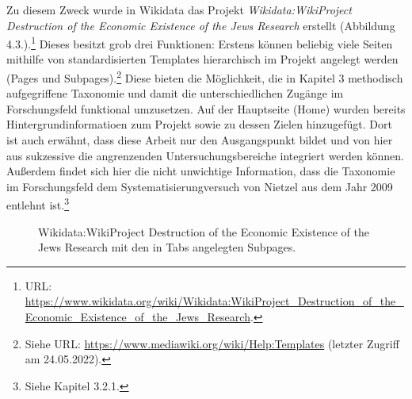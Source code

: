 Zu diesem Zweck wurde in Wikidata das Projekt \textit{Wikidata:WikiProject Destruction of the Economic Existence of the Jews Research} erstellt (Abbildung 4.3.).\footnote{URL: \url{https://www.wikidata.org/wiki/Wikidata:WikiProject_Destruction_of_the_Economic_Existence_of_the_Jews_Research}.} Dieses besitzt grob drei Funktionen: Erstens können beliebig viele Seiten mithilfe von standardisierten Templates hierarchisch im Projekt angelegt werden (Pages und Subpages).\footnote{Siehe URL: \url{https://www.mediawiki.org/wiki/Help:Templates} (letzter Zugriff am 24.05.2022).} Diese bieten die Möglichkeit, die in Kapitel 3 methodisch aufgegriffene Taxonomie und damit die unterschiedlichen Zugänge im Forschungsfeld funktional umzusetzen. Auf der Hauptseite (Home) wurden bereits Hintergrundinformatioen zum Projekt sowie zu dessen Zielen hinzugefügt. Dort ist auch erwähnt, dass diese Arbeit nur den Ausgangspunkt bildet und von hier aus sukzessive die angrenzenden Untersuchungsbereiche integriert werden können. Außerdem findet sich hier die nicht unwichtige Information, dass die Taxonomie im Forschungsfeld dem Systematisierungversuch von Nietzel aus dem Jahr 2009 entlehnt ist.\footnote{Siehe Kapitel 3.2.1.}

\begin{figure}[h]
    \centering
    \caption{Wikidata:WikiProject Destruction of the Economic Existence of the Jews Research mit den in Tabs angelegten Subpages.}
    \label{fig:x cubed graph}
\end{figure}

